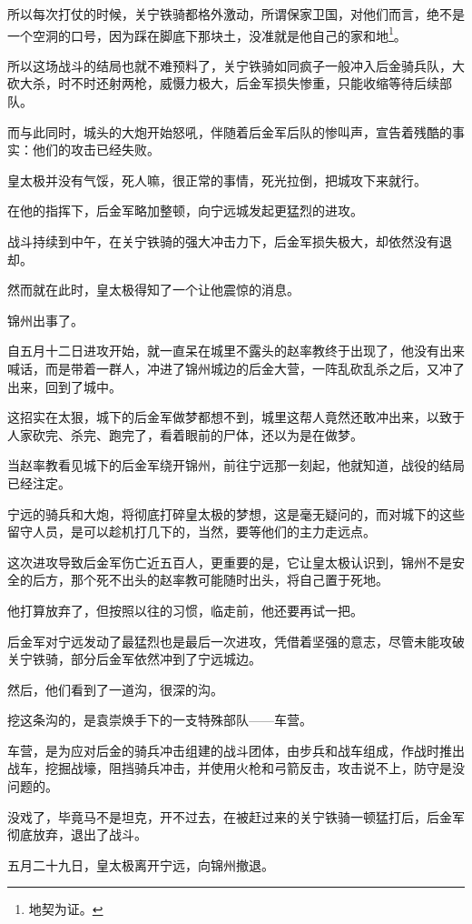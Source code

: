 \begin{multicols}{\theparacolNo}
所以每次打仗的时候，关宁铁骑都格外激动，所谓保家卫国，对他们而言，绝不是一个空洞的口号，因为踩在脚底下那块土，没准就是他自己的家和地\footnote{地契为证。}。

所以这场战斗的结局也就不难预料了，关宁铁骑如同疯子一般冲入后金骑兵队，大砍大杀，时不时还射两枪，威慑力极大，后金军损失惨重，只能收缩等待后续部队。

而与此同时，城头的大炮开始怒吼，伴随着后金军后队的惨叫声，宣告着残酷的事实：他们的攻击已经失败。

皇太极并没有气馁，死人嘛，很正常的事情，死光拉倒，把城攻下来就行。

在他的指挥下，后金军略加整顿，向宁远城发起更猛烈的进攻。

战斗持续到中午，在关宁铁骑的强大冲击力下，后金军损失极大，却依然没有退却。

然而就在此时，皇太极得知了一个让他震惊的消息。

锦州出事了。

自五月十二日进攻开始，就一直呆在城里不露头的赵率教终于出现了，他没有出来喊话，而是带着一群人，冲进了锦州城边的后金大营，一阵乱砍乱杀之后，又冲了出来，回到了城中。

这招实在太狠，城下的后金军做梦都想不到，城里这帮人竟然还敢冲出来，以致于人家砍完、杀完、跑完了，看着眼前的尸体，还以为是在做梦。

当赵率教看见城下的后金军绕开锦州，前往宁远那一刻起，他就知道，战役的结局已经注定。

宁远的骑兵和大炮，将彻底打碎皇太极的梦想，这是毫无疑问的，而对城下的这些留守人员，是可以趁机打几下的，当然，要等他们的主力走远点。

这次进攻导致后金军伤亡近五百人，更重要的是，它让皇太极认识到，锦州不是安全的后方，那个死不出头的赵率教可能随时出头，将自己置于死地。

他打算放弃了，但按照以往的习惯，临走前，他还要再试一把。

后金军对宁远发动了最猛烈也是最后一次进攻，凭借着坚强的意志，尽管未能攻破关宁铁骑，部分后金军依然冲到了宁远城边。

然后，他们看到了一道沟，很深的沟。

挖这条沟的，是袁崇焕手下的一支特殊部队——车营。

车营，是为应对后金的骑兵冲击组建的战斗团体，由步兵和战车组成，作战时推出战车，挖掘战壕，阻挡骑兵冲击，并使用火枪和弓箭反击，攻击说不上，防守是没问题的。

没戏了，毕竟马不是坦克，开不过去，在被赶过来的关宁铁骑一顿猛打后，后金军彻底放弃，退出了战斗。

五月二十九日，皇太极离开宁远，向锦州撤退。


\end{multicols}
